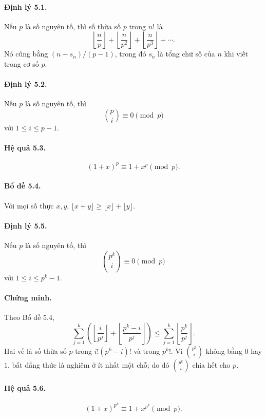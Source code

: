 \documentclass[11pt]{article}
\begin{document}
\paragraph{Định lý 5.1.}
Nếu \(p\) là số nguyên tố, thì số thừa số \(p\) trong \(n!\) là
\[
 \left\lfloor\frac np\right\rfloor+
 \left\lfloor\frac n{p^2}\right\rfloor+
 \left\lfloor\frac n{p^3}\right\rfloor+\cdots.
\]
Nó cũng bằng \((n-s_n)/(p-1)\), trong đó \(s_n\) là tổng chữ số của \(n\) khi
viết trong cơ số \(p\).

\paragraph{Định lý 5.2.}
Nếu \(p\) là số nguyên tố, thì
\[
 \binom pi\equiv0\pmod p
\]
với \(1\le i\le p-1\).

\paragraph{Hệ quả 5.3.}
\[
 (1+x)^p\equiv1+x^p\pmod p.
\]

\paragraph{Bổ đề 5.4.}
Với mọi số thực \(x,y\), \(\lfloor x+y\rfloor\ge\lfloor x\rfloor+\lfloor y\rfloor\).

\paragraph{Định lý 5.5.}
Nếu \(p\) là số nguyên tố, thì
\[
 \binom{p^k}{i}\equiv0\pmod p
\]
với \(1\le i\le p^k-1\).

\paragraph{Chứng minh.}
Theo Bổ đề 5.4,
\[
 \sum_{j=1}^k\left(
\left\lfloor\frac i{p^j}\right\rfloor+
\left\lfloor\frac{p^k-i}{p^j}\right\rfloor
\right)
\le
\sum_{j=1}^k\left\lfloor\frac{p^k}{p^j}\right\rfloor.
\]
Hai vế là số thừa số \(p\) trong \(i!(p^k-i)!\) và trong \(p^k!\). Vì
\(\binom{p^k}{i}\) không bằng \(0\) hay \(1\), bất đẳng thức là nghiêm ở ít
nhất một chỗ; do đó \(\binom{p^k}{i}\) chia hết cho \(p\).

\paragraph{Hệ quả 5.6.}
\[
 (1+x)^{p^k}\equiv1+x^{p^k}\pmod p.
\]
\end{document}

